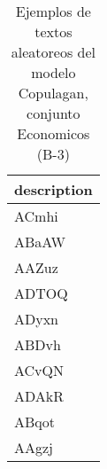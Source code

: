 \begin{table}[H]
\centering
\fontsize{8}{14}\selectfont
\caption{Ejemplos de textos aleatoreos del modelo Copulagan, conjunto Economicos (B-3)}
\label{table-sample10-economicos-b-3-copulagan-text}
\begin{tabular}{|m{50em}|}
\hline
\rowcolor[gray]{0.8}
description \\
\hline ACmhi \\
\hline ABaAW \\
\hline AAZuz \\
\hline ADTOQ \\
\hline ADyxn \\
\hline ABDvh \\
\hline ACvQN \\
\hline ADAkR \\
\hline ABqot \\
\hline AAgzj \\
\hline
\end{tabular}
\end{table}
